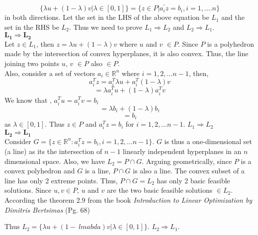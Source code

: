 \documentclass[11pt]{article}
\begin{document}
\[ \{\lambda u + (1-\lambda) v | \lambda \in [0,1] \} = \{z \in P | a_{i}^{'}z =  b_i, i = 1,....n\} \]
in both directions. Let the set in the LHS of the above equation be $L_1$ and the set in the RHS be $L_2$. Thus we need to prove $L_1 \Rightarrow L_2$ and $L_2 \Rightarrow L_1$. \\

\underline{$\mathbf{L_1 \Rightarrow L_2}$} \\

Let $z \in L_1$, then $z = \lambda u + (1 - \lambda) v$ where $u$ and $v$ $\in P$. Since $P$ is a polyhedron made by the intersection of convex hyperplanes, it is also convex. Thus, the line joining two points $u$, $v$ $\in P$ also $\in P$. \\
Also, consider a set of vectors $a_i \in \mathbb{R}^n$ where $i = 1,2,...n-1$, then, 
\[ a_{i}^T z = a_{i}^T \lambda u + a_{i}^T (1 - \lambda)v \]
\[ = \lambda a_{i}^T u + (1-\lambda)a_{i}^T v\] 
We know that , $a_{i}^T u = a_{i}^T v = b_i$ \\
\[ = \lambda b_i + (1-\lambda) b_i\]
\[ = b_i \]
as $\lambda \in [0,1]$. Thus $z \in P$ and $a_{i}^T z = b_i$ for $i=1,2,...n-1$. $L_1 \Rightarrow L_2$\\

\underline{$\mathbf{L_2 \Rightarrow L_1}$} \\

Consider $G = \{ z \in \mathbb{R}^n : a_{i}^T z = b_i, i = 1,2,...n-1\}$. $G$ is thus a one-dimensional set (a line) as its the intersection of $n-1$ linearly independent hyperplanes in an $n$ dimensional space. Also, we have $L_2 = P \cap G$. Arguing geometrically, since $P$ is a convex polyhedron and $G$ is a line, $ P \cap G$ is also a line. The convex subset of a line has only 2 extreme points. Thus, $P \cap G = L_2$ has only 2 basic feasible solutions. Since $u,v \in P$, $u$ and $v$ are the two basic feasible solutions $\in L_2$. According the theorem 2.9 from the book \textit{Introduction to Linear Optimization by Dimitris Bertsimas} (Pg. 68)

\noindent{}
Thus $L_2 = \{\lambda u + (1- \ lmabda)v | \lambda \in [0,1]\}$. $L_2 \Rightarrow L_1$.
\end{document}
